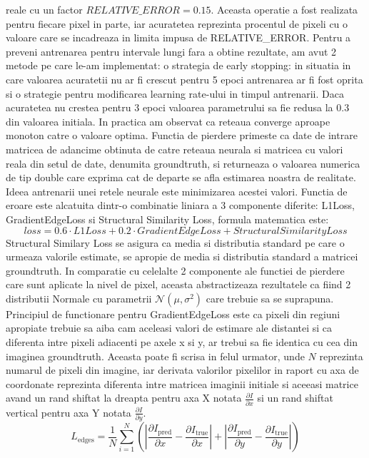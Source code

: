 \documentclass[12pt,a4paper]{report}
\begin{document}
reale cu un factor $ RELATIVE\_ERROR=0.15 $. Aceasta operatie a fost realizata pentru fiecare pixel in parte, iar
acuratetea reprezinta procentul de pixeli cu o valoare care se incadreaza in limita impusa de RELATIVE\_ERROR.\@
Pentru a preveni antrenarea pentru intervale lungi fara a obtine rezultate, am avut 2 metode pe care le-am implementat:
o strategia de early stopping: in situatia in care valoarea acuratetii nu ar fi crescut pentru 5 epoci antrenarea 
ar fi fost oprita si o strategie pentru modificarea learning rate-ului in timpul antrenarii. Daca acuratetea nu crestea 
pentru 3 epoci valoarea parametrului sa fie redusa la 0.3 din valoarea initiala. In practica am observat ca reteaua 
converge aproape monoton catre o valoare optima. Functia de pierdere primeste ca date de intrare matricea de adancime 
obtinuta de catre reteaua neurala si matricea cu valori reala din setul de date, denumita groundtruth, si returneaza o valoarea 
numerica de tip double care exprima cat de departe se afla estimarea noastra de realitate. Ideea antrenarii unei retele 
neurale este minimizarea acestei valori. Functia de eroare este alcatuita dintr-o combinatie liniara a 
3 componente diferite: L1Loss, GradientEdgeLoss si Structural Similarity Loss, formula matematica este:
\begin{equation}
    loss = 0.6 \cdot L1Loss + 0.2 \cdot GradientEdgeLoss + StructuralSimilarityLoss 
\end{equation}  
Structural Similary Loss se asigura ca media si distributia standard pe care o urmeaza valorile estimate, se apropie
de media si distributia standard a matricei groundtruth. In comparatie cu celelalte 2 componente ale functiei de 
pierdere care sunt aplicate la nivel de pixel, aceasta abstractizeaza rezultatele ca fiind 2 distributii Normale 
cu parametrii $ \mathcal{N}(\mu, \sigma^2) $ care trebuie sa se suprapuna.                     
Principiul de functionare pentru GradientEdgeLoss este ca pixeli din regiuni apropiate trebuie sa aiba cam aceleasi 
valori de estimare ale distantei si ca diferenta intre pixeli adiacenti pe axele x si y, ar trebui sa fie identica
cu cea din imaginea groundtruth. Aceasta poate fi scrisa in felul urmator, unde $ N $ reprezinta numarul de pixeli din 
imagine, iar derivata valorilor pixelilor in raport cu axa de coordonate reprezinta diferenta intre matricea imaginii
initiale si aceeasi matrice avand un rand shiftat la dreapta  pentru axa X notata $ \frac{\partial I}{\partial x} $
si un rand shiftat vertical pentru axa Y notata $ \frac{\partial I}{\partial y} $.  
\begin{equation}
    L_{\text{edges}} = \frac{1}{N} \sum_{i=1}^{N} \left( 
    \left| \frac{\partial I_{\text{pred}}}{\partial x} - \frac{\partial I_{\text{true}}}{\partial x} \right| + 
    \left| \frac{\partial I_{\text{pred}}}{\partial y} - \frac{\partial I_{\text{true}}}{\partial y} \right|
    \right)
\end{equation}
\end{document}
